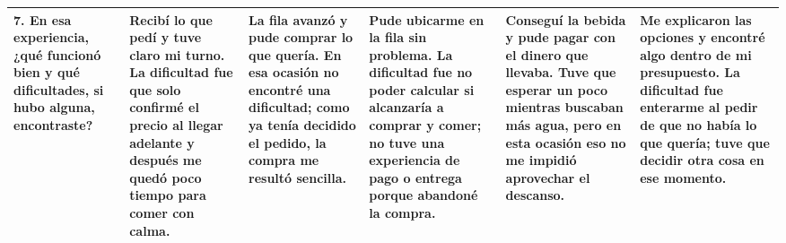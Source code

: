 \documentclass[12pt]{article}
\newcommand{\sol}[1]{{\color{solutionred}\small\strut #1\strut}}
\begin{document}
\begin{longtable}{|*{6}{L{\dimexpr(\arrayrulewidth)/6\relax}|}}
\textbf{7.} En esa experiencia, ¿qué funcionó bien y qué dificultades, si hubo alguna, encontraste? & \sol{Recibí lo que pedí y tuve claro mi turno. La dificultad fue que solo confirmé el precio al llegar adelante y después me quedó poco tiempo para comer con calma.} & \sol{La fila avanzó y pude comprar lo que quería. En esa ocasión no encontré una dificultad; como ya tenía decidido el pedido, la compra me resultó sencilla.} & \sol{Pude ubicarme en la fila sin problema. La dificultad fue no poder calcular si alcanzaría a comprar y comer; no tuve una experiencia de pago o entrega porque abandoné la compra.} & \sol{Conseguí la bebida y pude pagar con el dinero que llevaba. Tuve que esperar un poco mientras buscaban más agua, pero en esta ocasión eso no me impidió aprovechar el descanso.} & \sol{Me explicaron las opciones y encontré algo dentro de mi presupuesto. La dificultad fue enterarme al pedir de que no había lo que quería; tuve que decidir otra cosa en ese momento.} \\ \hline
\end{longtable}\endgroup
\end{document}
